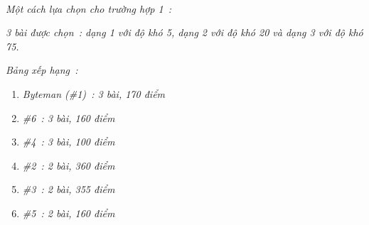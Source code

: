  

\emph{Một cách lựa chọn cho trường hợp 1 : }

\emph{3 bài được chọn : dạng 1 với độ khó 5, dạng 2 với độ khó 20 và dạng 3 với độ khó 75. }

\emph{Bảng xếp hạng : }
\begin{enumerate}
	\item 

\emph{Byteman (\#1) : 3 bài, 170 điểm }
	\item 

\emph{\#6 : 3 bài, 160 điểm }
	\item 

\emph{\#4 : 3 bài, 100 điểm }
	\item 

\emph{\#2 : 2 bài, 360 điểm }
	\item 

\emph{\#3 : 2 bài, 355 điểm }
	\item 

\emph{\#5 : 2 bài, 160 điểm }
\end{enumerate}
